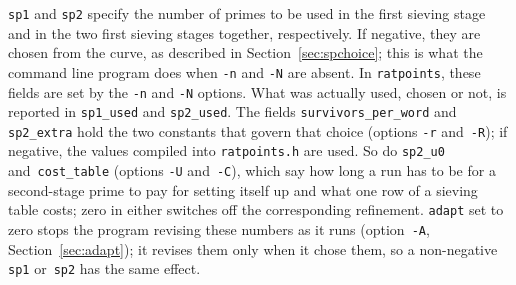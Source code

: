 \documentclass[12pt,a4paper,oneside]{amsart}
\begin{document}
\texttt{sp1} and \texttt{sp2}
specify the number of primes to be used in the first sieving stage and
in the two first sieving stages together, respectively. If negative, they are chosen
from the curve, as described in Section~\ref{sec:spchoice}; this is what the
command line program does when \verb+-n+ and \verb+-N+ are absent. In
\texttt{ratpoints}, these fields are set by the
\verb+-n+ and \verb+-N+ options. What was actually used, chosen or not,
is reported in \texttt{sp1\_used} and \texttt{sp2\_used}. The fields
\texttt{survivors\_per\_word} and \texttt{sp2\_extra} hold the two
constants that govern that choice (options \verb+-r+ and~\verb+-R+); if
negative, the values compiled into \texttt{ratpoints.h} are used. So do
\texttt{sp2\_u0} and~\texttt{cost\_table} (options \verb+-U+ and~\verb+-C+),
which say how long a run has to be for a second-stage prime to pay for
setting itself up and what one row of a sieving table costs; zero in either
switches off the corresponding refinement. \texttt{adapt} set to zero stops
the program revising these numbers as it runs (option~\verb+-A+,
Section~\ref{sec:adapt}); it revises them only when it chose them, so a
non-negative \texttt{sp1} or~\texttt{sp2} has the same effect.
\end{document}
